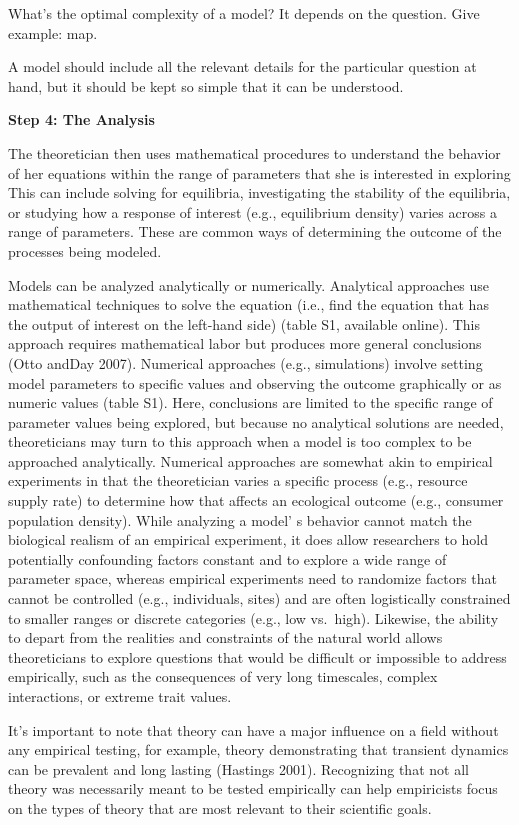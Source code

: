 \documentclass[
]{book}
\theoremstyle{definition}
\theoremstyle{definition}
\theoremstyle{definition}
\theoremstyle{definition}
\theoremstyle{remark}
\begin{document}
What's the optimal complexity of a model?
It depends on the question. Give example: map.

A model should include all the relevant details for the particular question at hand, but it should be kept so simple that it can be understood.

\textbf{Step 4: The Analysis}

The theoretician then uses mathematical procedures to understand the behavior of her equations within the range of parameters that she is interested in exploring This can include solving for equilibria, investigating the stability of the equilibria, or studying how a response of interest (e.g., equilibrium density) varies across a range of parameters. These are common ways of determining the outcome of the processes being modeled.

Models can be analyzed analytically or numerically. Analytical approaches use mathematical techniques to solve the equation (i.e., find the equation that has the output of interest on the left-hand side) (table S1, available online). This approach requires mathematical labor but produces more general conclusions (Otto andDay 2007). Numerical approaches (e.g., simulations) involve setting model parameters to specific values and observing the outcome graphically or as numeric values (table S1). Here, conclusions are limited to the specific range of parameter values being explored, but because no analytical solutions are needed, theoreticians may turn to this approach when a model is too complex to be approached analytically. Numerical approaches are somewhat akin to empirical experiments in that the theoretician varies a specific process (e.g., resource supply rate) to determine how that affects an ecological outcome (e.g., consumer population density). While analyzing a model' s behavior cannot match the biological realism of an empirical experiment, it does allow researchers to hold potentially confounding factors constant and to explore a wide range of parameter space, whereas empirical experiments need to randomize factors that cannot be controlled (e.g., individuals, sites) and are often logistically constrained to smaller ranges or discrete categories (e.g., low vs.~high). Likewise, the ability to depart from the realities and constraints of the natural world allows theoreticians to explore questions that would be difficult or impossible to address empirically, such as the consequences of very long timescales, complex interactions, or extreme trait values.

It's important to note that theory can have a major influence on a field without any empirical testing, for example, theory demonstrating that transient dynamics can be prevalent and long lasting (Hastings 2001). Recognizing that not all theory was necessarily meant to be tested empirically can help empiricists focus on the types of theory that are most relevant to their scientific goals.
\end{document}
